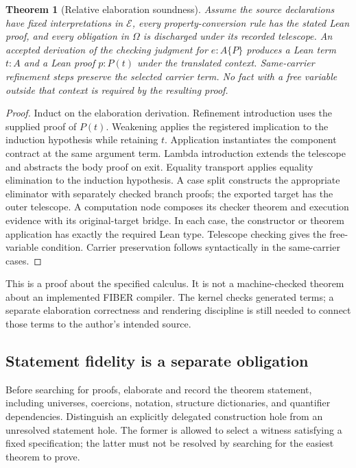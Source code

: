 \documentclass[11pt,letterpaper]{article}
\newtheorem{theorem}{Theorem}[section]
\theoremstyle{definition}\newtheorem{definition}[theorem]{Definition}
\begin{document}
\begin{theorem}[Relative elaboration soundness]\label{thm:elaboration}
Assume the source declarations have fixed interpretations in $\mathcal E$, every property-conversion rule has the stated Lean proof, and every obligation in $\Omega$ is discharged under its recorded telescope. An accepted derivation of the checking judgment for $e:A\{P\}$ produces a Lean term $t:A$ and a Lean proof $p:P(t)$ under the translated context. Same-carrier refinement steps preserve the selected carrier term. No fact with a free variable outside that context is required by the resulting proof.
\end{theorem}
\begin{proof}
Induct on the elaboration derivation. Refinement introduction uses the supplied proof of $P(t)$. Weakening applies the registered implication to the induction hypothesis while retaining $t$. Application instantiates the component contract at the same argument term. Lambda introduction extends the telescope and abstracts the body proof on exit. Equality transport applies equality elimination to the induction hypothesis. A case split constructs the appropriate eliminator with separately checked branch proofs; the exported target has the outer telescope. A computation node composes its checker theorem and execution evidence with its original-target bridge. In each case, the constructor or theorem application has exactly the required Lean type. Telescope checking gives the free-variable condition. Carrier preservation follows syntactically in the same-carrier cases.
\end{proof}
This is a proof about the specified calculus. It is not a machine-checked theorem about an implemented FIBER compiler. The kernel checks generated terms; a separate elaboration correctness and rendering discipline is still needed to connect those terms to the author's intended source.

\subsection{Statement fidelity is a separate obligation}
Before searching for proofs, elaborate and record the theorem statement, including universes, coercions, notation, structure dictionaries, and quantifier dependencies. Distinguish an explicitly delegated construction hole from an unresolved statement hole. The former is allowed to select a witness satisfying a fixed specification; the latter must not be resolved by searching for the easiest theorem to prove.
\end{document}
